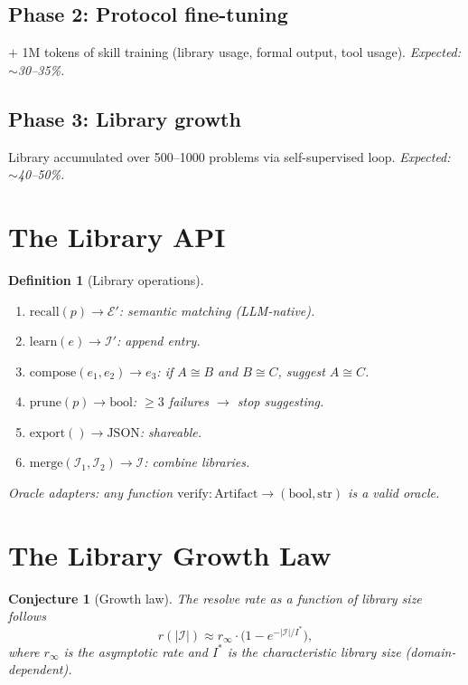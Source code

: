 \documentclass{article}
\newtheorem{definition}[theorem]{Definition}
\newtheorem{conjecture}[theorem]{Conjecture}
\newcommand{\calE}{\mathcal{E}}
\newcommand{\calI}{\mathcal{I}}
\begin{document}
\subsection{Phase 2: Protocol fine-tuning}
$+$ 1M tokens of skill training (library usage, formal output,
tool usage).
\emph{Expected: $\sim$30--35\%.}

\subsection{Phase 3: Library growth}
Library accumulated over 500--1000 problems via self-supervised
loop.
\emph{Expected: $\sim$40--50\%.}

\section{The Library API}\label{sec:api}

\begin{definition}[Library operations]\label{def:api}
\begin{enumerate}[nosep]
  \item $\mathrm{recall}(p) \to \calE'$: semantic matching
    (LLM-native).
  \item $\mathrm{learn}(e) \to \calI'$: append entry.
  \item $\mathrm{compose}(e_1, e_2) \to e_3$: if $A \cong B$
    and $B \cong C$, suggest $A \cong C$.
  \item $\mathrm{prune}(p) \to \mathrm{bool}$: $\geq 3$
    failures $\to$ stop suggesting.
  \item $\mathrm{export}() \to \mathrm{JSON}$: shareable.
  \item $\mathrm{merge}(\calI_1, \calI_2) \to \calI$:
    combine libraries.
\end{enumerate}
Oracle adapters: any function
$\mathrm{verify}: \mathrm{Artifact} \to (\mathrm{bool},
\mathrm{str})$ is a valid oracle.
\end{definition}

\section{The Library Growth Law}\label{sec:growth}

\begin{conjecture}[Growth law]\label{conj:growth}
The resolve rate as a function of library size follows
\begin{equation}\label{eq:growth}
  r(|\calI|) \approx r_\infty \cdot
  \bigl(1 - e^{-|\calI|/I^*}\bigr),
\end{equation}
where $r_\infty$ is the asymptotic rate and $I^*$ is the
characteristic library size (domain-dependent).
\end{conjecture}
\end{document}
